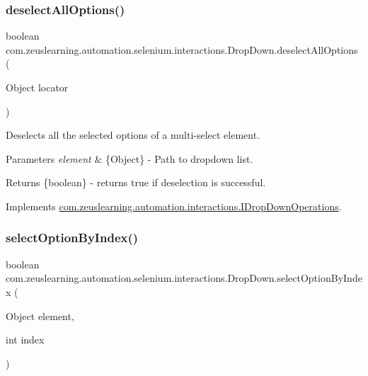 \subsubsection{\texorpdfstring{deselect\+All\+Options()}{deselectAllOptions()}}
{\footnotesize\ttfamily boolean com.\+zeuslearning.\+automation.\+selenium.\+interactions.\+Drop\+Down.\+deselect\+All\+Options (\begin{DoxyParamCaption}\item[{Object}]{locator }\end{DoxyParamCaption})\hspace{0.3cm}{\ttfamily [inline]}}

Deselects all the selected options of a multi-\/select element.


\begin{DoxyParams}{Parameters}
{\em element} & \{Object\} -\/ Path to dropdown list.\\
\hline
\end{DoxyParams}
\begin{DoxyReturn}{Returns}
\{boolean\} -\/ returns {\ttfamily true} if deselection is successful. 
\end{DoxyReturn}


Implements \hyperlink{interfacecom_1_1zeuslearning_1_1automation_1_1interactions_1_1IDropDownOperations_a4dd56924f06c48807581673c5c757405}{com.\+zeuslearning.\+automation.\+interactions.\+I\+Drop\+Down\+Operations}.

\hypertarget{classcom_1_1zeuslearning_1_1automation_1_1selenium_1_1interactions_1_1DropDown_a90eaa639ff1980274aa7e27a29ad7230}{}\label{classcom_1_1zeuslearning_1_1automation_1_1selenium_1_1interactions_1_1DropDown_a90eaa639ff1980274aa7e27a29ad7230} 
\subsubsection{\texorpdfstring{select\+Option\+By\+Index()}{selectOptionByIndex()}}
{\footnotesize\ttfamily boolean com.\+zeuslearning.\+automation.\+selenium.\+interactions.\+Drop\+Down.\+select\+Option\+By\+Index (\begin{DoxyParamCaption}\item[{Object}]{element,  }\item[{int}]{index }\end{DoxyParamCaption})\hspace{0.3cm}{\ttfamily [inline]}}

